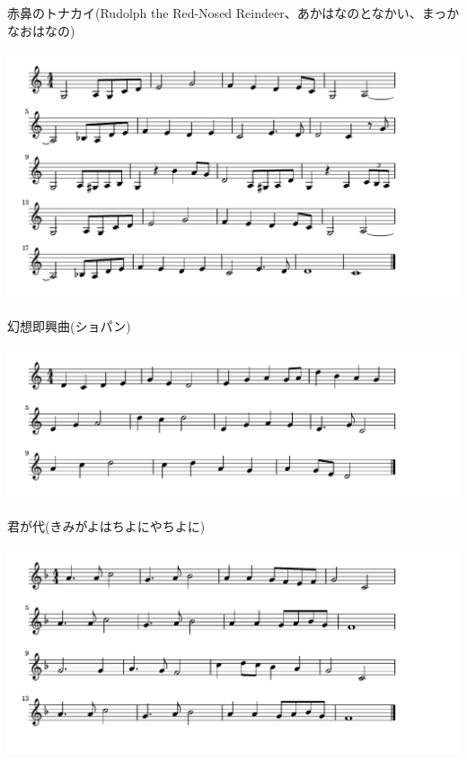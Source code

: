 \documentclass[a4paper]{ltjsarticle}
\begin{document}
\vspace{-10mm} \hspace{10mm}
赤鼻のトナカイ(Rudolph the Red-Nosed Reindeer、あかはなのとなかい、まっかなおはなの)






\includegraphics[clip]{gensou_crop.pdf}

\vspace{-10mm} \hspace{10mm}
幻想即興曲(ショパン)

\includegraphics[clip]{kimigayo_crop.pdf}

\vspace{-10mm} \hspace{10mm}
君が代(きみがよはちよにやちよに)

\includegraphics[clip]{schubertkomori_crop.pdf}
\end{document}
